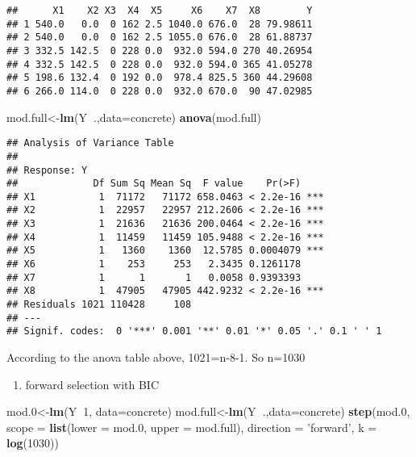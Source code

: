 \documentclass[]{article}
\newenvironment{Shaded}{\begin{snugshade}}{\end{snugshade}}
\newcommand{\KeywordTok}[1]{\textcolor[rgb]{0.13,0.29,0.53}{\textbf{#1}}}
\newcommand{\DataTypeTok}[1]{\textcolor[rgb]{0.13,0.29,0.53}{#1}}
\newcommand{\DecValTok}[1]{\textcolor[rgb]{0.00,0.00,0.81}{#1}}
\newcommand{\StringTok}[1]{\textcolor[rgb]{0.31,0.60,0.02}{#1}}
\newcommand{\OperatorTok}[1]{\textcolor[rgb]{0.81,0.36,0.00}{\textbf{#1}}}
\newcommand{\NormalTok}[1]{#1}
\providecommand{\tightlist}{%
  \setlength{\itemsep}{0pt}\setlength{\parskip}{0pt}}
\begin{document}
\begin{verbatim}
##      X1    X2 X3  X4  X5     X6    X7  X8        Y
## 1 540.0   0.0  0 162 2.5 1040.0 676.0  28 79.98611
## 2 540.0   0.0  0 162 2.5 1055.0 676.0  28 61.88737
## 3 332.5 142.5  0 228 0.0  932.0 594.0 270 40.26954
## 4 332.5 142.5  0 228 0.0  932.0 594.0 365 41.05278
## 5 198.6 132.4  0 192 0.0  978.4 825.5 360 44.29608
## 6 266.0 114.0  0 228 0.0  932.0 670.0  90 47.02985
\end{verbatim}

\begin{Shaded}
\begin{Highlighting}[]
\NormalTok{mod.full<-}\KeywordTok{lm}\NormalTok{(Y}\OperatorTok{~}\NormalTok{.,}\DataTypeTok{data=}\NormalTok{concrete)}
\KeywordTok{anova}\NormalTok{(mod.full)}
\end{Highlighting}
\end{Shaded}

\begin{verbatim}
## Analysis of Variance Table
## 
## Response: Y
##             Df Sum Sq Mean Sq  F value    Pr(>F)    
## X1           1  71172   71172 658.0463 < 2.2e-16 ***
## X2           1  22957   22957 212.2606 < 2.2e-16 ***
## X3           1  21636   21636 200.0464 < 2.2e-16 ***
## X4           1  11459   11459 105.9488 < 2.2e-16 ***
## X5           1   1360    1360  12.5785 0.0004079 ***
## X6           1    253     253   2.3435 0.1261178    
## X7           1      1       1   0.0058 0.9393393    
## X8           1  47905   47905 442.9232 < 2.2e-16 ***
## Residuals 1021 110428     108                       
## ---
## Signif. codes:  0 '***' 0.001 '**' 0.01 '*' 0.05 '.' 0.1 ' ' 1
\end{verbatim}

According to the anova table above, 1021=n-8-1. So n=1030

\begin{enumerate}
\def\labelenumi{\alph{enumi})}
\tightlist
\item
  forward selection with BIC
\end{enumerate}

\begin{Shaded}
\begin{Highlighting}[]
\NormalTok{mod.}\DecValTok{0}\NormalTok{<-}\KeywordTok{lm}\NormalTok{(Y}\OperatorTok{~}\DecValTok{1}\NormalTok{, }\DataTypeTok{data=}\NormalTok{concrete)}
\NormalTok{mod.full<-}\KeywordTok{lm}\NormalTok{(Y}\OperatorTok{~}\NormalTok{.,}\DataTypeTok{data=}\NormalTok{concrete)}
\KeywordTok{step}\NormalTok{(mod.}\DecValTok{0}\NormalTok{, }\DataTypeTok{scope =} \KeywordTok{list}\NormalTok{(}\DataTypeTok{lower =}\NormalTok{ mod.}\DecValTok{0}\NormalTok{, }\DataTypeTok{upper =}\NormalTok{ mod.full), }\DataTypeTok{direction =} \StringTok{'forward'}\NormalTok{, }\DataTypeTok{k =} \KeywordTok{log}\NormalTok{(}\DecValTok{1030}\NormalTok{))}
\end{Highlighting}
\end{Shaded}
\end{document}

